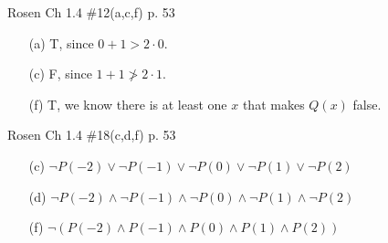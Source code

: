 \documentclass[12pt,addpoints]{exam}
\begin{document}
\begin{questions}
\question Rosen Ch 1.4 \#12(a,c,f) p. 53
    \ifprintanswers
        \vspace{-10pt}
    \fi
\begin{solution}
    \begin{itemize}[itemsep=0pt,parsep=0pt,topsep=0pt,partopsep=0pt]
        \item[(a)] T, since $0 + 1 > 2\cdot 0$.
        \item[(c)] F, since $1 + 1 \ngtr 2\cdot 1$.
        \item[(f)] T, we know there is at least one $x$ that makes $Q(x)$ false.
    \end{itemize}
\end{solution}


\question Rosen Ch 1.4 \#18(c,d,f) p. 53
    \ifprintanswers
        \vspace{-10pt}
    \fi
\begin{solution}
    \begin{itemize}[itemsep=0pt,parsep=0pt,topsep=0pt,partopsep=0pt]
        \item[(c)] $\neg P(-2) \vee \neg P(-1) \vee \neg P(0) \vee \neg P(1) \vee \neg P(2)$
        \item[(d)] $\neg P(-2) \wedge \neg P(-1) \wedge \neg P(0) \wedge \neg P(1) \wedge \neg P(2)$
        \item[(f)] $\neg (P(-2) \wedge P(-1) \wedge P(0) \wedge P(1) \wedge P(2))$
    \end{itemize}
\end{solution}



\end{questions}
\end{document}
